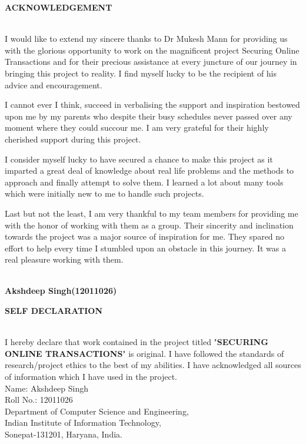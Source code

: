 \documentclass[12pt, oneside, a4paper]{article}
\begin{document}
\thispagestyle{empty}
\pagebreak
\begin{center}
    \begin{Large}\textbf{ACKNOWLEDGEMENT}\end{Large}
\end{center}\\
\vspace{1cm}
I would like to extend my sincere thanks to Dr Mukesh Mann for providing us with the glorious opportunity to work on the magnificent project Securing Online Transactions and for their precious assistance at every juncture of our journey in bringing this project to reality. I find myself lucky to be the recipient of his advice and encouragement. 

I cannot ever I think, succeed in verbalising the support and inspiration bestowed upon me by my parents who despite their busy schedules never passed over any moment where they could succour me. I am very grateful for their highly cherished support during this project.

I consider myself lucky to have secured a chance to make this project as it imparted a great deal of knowledge about real life problems and the methods to approach and finally attempt to solve them. I learned a lot about many tools which were initially new to me to handle such projects. 

Last but not the least, I am very thankful to my team members for providing me with the honor of working with them as a group. Their sincerity and inclination towards the project was a major source of inspiration for me. They spared no effort to help every time I stumbled upon an obstacle in this journey. It was a real pleasure working with them.

\vspace{2cm}\\
\textbf{Akshdeep Singh(12011026)}
\setcounter{page}{2}
\pagebreak

\begin{center}
    \begin{Large}\textbf{SELF DECLARATION}\end{Large}
\end{center}\\
\vspace{1cm}
I hereby declare that work contained in the project titled "\textbf{SECURING ONLINE TRANSACTIONS}" is original. I have followed the standards of research/project ethics to the best of my abilities. I have acknowledged all sources of information which I have used in the project.
\vspace{4cm}\\
Name: Akshdeep Singh\\
Roll No.: 12011026\\
Department of Computer Science and Engineering,\\
Indian Institute of Information Technology,\\
Sonepat-131201, Haryana, India.
\pagebreak
\end{document}
